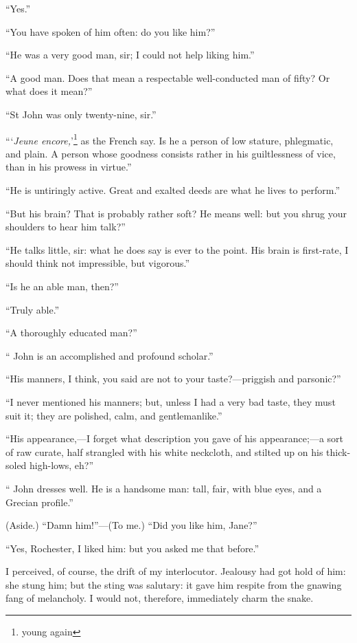 \enquote{Yes.}

\enquote{You have spoken of him often: do you like him?}

\enquote{He was a very good man, sir; I could not help liking him.}

\enquote{A good man. Does that mean a respectable well-conducted man of
	fifty? Or what does it mean?}

\enquote{St John was only twenty-nine, sir.}

\enquote{\foreignquote{french}{\emph{Jeune encore,}}\footnote{young again} as the French say. Is he a person of low
	stature, phlegmatic, and plain. A person whose goodness consists rather
	in his guiltlessness of vice, than in his prowess in virtue.}

\enquote{He is untiringly active. Great and exalted deeds are what he
	lives to perform.}

\enquote{But his brain? That is probably rather soft? He means well:
	but you shrug your shoulders to hear him talk?}

\enquote{He talks little, sir: what he does say is ever to the point.
	His brain is first-rate, I should think not impressible, but vigorous.}

\enquote{Is he an able man, then?}

\enquote{Truly able.}

\enquote{A thoroughly educated man?}

\enquote{\St{} John is an accomplished and profound scholar.}

\enquote{His manners, I think, you said are not to your
	taste?---priggish and parsonic?}

\enquote{I never mentioned his manners; but, unless I had a very bad
	taste, they must suit it; they are polished, calm, and gentlemanlike.}

\enquote{His appearance,---I forget what description you gave of his
	appearance;---a sort of raw curate, half strangled with his white
	neckcloth, and stilted up on his thick-soled high-lows, eh?}

\enquote{\St{} John dresses well. He is a handsome man: tall, fair, with
	blue eyes, and a Grecian profile.}

(Aside.) \enquote{Damn him!}---(To me.) \enquote{Did you like him,
	Jane?}

\enquote{Yes, \Mr{} Rochester, I liked him: but you asked me that before.}

I perceived, of course, the drift of my interlocutor. Jealousy had got
hold of him: she stung him; but the sting was salutary: it gave him
respite from the gnawing fang of melancholy. I would not, therefore,
immediately charm the snake.

